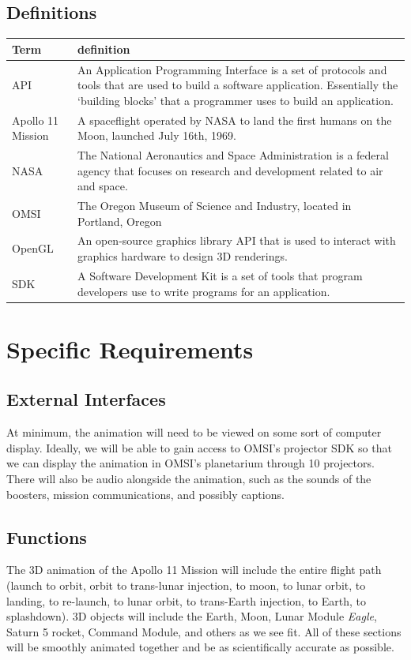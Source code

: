 \documentclass[onecolumn, draftclsnofoot,10pt, compsoc]{IEEEtran}
\begin{document}
    \subsection{Definitions}
\begin{tabular} {|l|p{13.5cm}|}
    \hline
    Term & definition \\ \hline
    API & An Application Programming Interface is a set of protocols and tools that are used to build a software application. Essentially the `building blocks' that a programmer uses to build an application.  \\ \hline
    Apollo 11 Mission & A spaceflight operated by NASA to land the first humans on the Moon, launched July 16th, 1969.  \\ \hline
    NASA & The National Aeronautics and Space Administration is a federal agency that focuses on research and development related to air and space.	\\ \hline
    OMSI & The Oregon Museum of Science and Industry, located in Portland, Oregon	\\ \hline
    OpenGL & An open-source graphics library API that is used to interact with graphics hardware to design 3D renderings.	\\ \hline
    SDK & A Software Development Kit is a set of tools that program developers use to write programs for an application. \\ \hline

\end{tabular}
\section{Specific Requirements}
    \subsection{External Interfaces}
    At minimum, the animation will need to be viewed on some sort of computer display. Ideally, we will be able to gain access to OMSI's projector SDK so that we can display the animation in OMSI's planetarium through 10 projectors. There will also be audio alongside the animation, such as the sounds of the boosters, mission communications, and possibly captions.
    \subsection{Functions}
    The 3D animation of the Apollo 11 Mission will include the entire flight path (launch to orbit, orbit to trans-lunar injection, to moon, to lunar orbit, to landing, to re-launch, to lunar orbit, to trans-Earth injection, to Earth, to splashdown). 3D objects will include the Earth, Moon, Lunar Module \textit{Eagle}, Saturn 5 rocket, Command Module, and others as we see fit. All of these sections will be smoothly animated together and be as scientifically accurate as possible.
\end{document}

